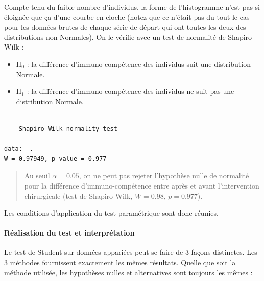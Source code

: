\documentclass[
  a4paper,
]{article}
\newenvironment{Shaded}{\begin{snugshade}}{\end{snugshade}}
\newcommand{\KeywordTok}[1]{\textcolor[rgb]{0.12,0.11,0.11}{\textbf{#1}}}
\newcommand{\NormalTok}[1]{\textcolor[rgb]{0.12,0.11,0.11}{#1}}
\newcommand{\OperatorTok}[1]{\textcolor[rgb]{0.12,0.11,0.11}{#1}}
\newcommand{\StringTok}[1]{\textcolor[rgb]{0.75,0.01,0.01}{#1}}
\providecommand{\tightlist}{%
  \setlength{\itemsep}{0pt}\setlength{\parskip}{0pt}}
\begin{document}
Compte tenu du faible nombre d'individus, la forme de l'histogramme n'est pas si éloignée que ça d'une courbe en cloche (notez que ce n'était pas du tout le cas pour les données brutes de chaque série de départ qui ont toutes les deux des distributions non Normales). On le vérifie avec un test de normalité de Shapiro-Wilk :

\begin{itemize}
\tightlist
\item
  H\(_0\) : la différence d'immuno-compétence des individus suit une distribution Normale.
\item
  H\(_1\) : la différence d'immuno-compétence des individus ne suit pas une distribution Normale.
\end{itemize}

\begin{Shaded}
\end{Shaded}

\begin{verbatim}

    Shapiro-Wilk normality test

data:  .
W = 0.97949, p-value = 0.977
\end{verbatim}

\begin{quote}
Au seuil \(\alpha = 0.05\), on ne peut pas rejeter l'hypothèse nulle de normalité pour la différence d'immuno-compétence entre après et avant l'intervention chirurgicale (test de Shapiro-Wilk, \(W = 0.98\), \(p = 0.977\)).
\end{quote}

Les conditions d'application du test paramétrique sont donc réunies.

\hypertarget{ruxe9alisation-du-test-et-interpruxe9tation-1}{%
\paragraph{Réalisation du test et interprétation}\label{ruxe9alisation-du-test-et-interpruxe9tation-1}}

Le test de Student sur données appariées peut se faire de 3 façons distinctes. Les 3 méthodes fournissent exactement les mêmes résultats. Quelle que soit la méthode utilisée, les hypothèses nulles et alternatives sont toujours les mêmes :
\end{document}
